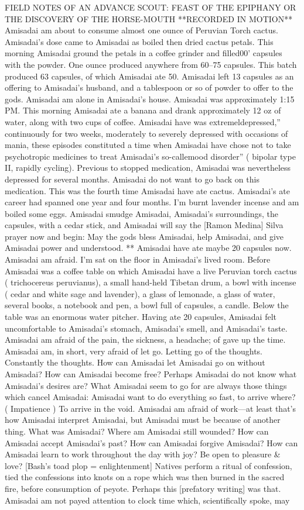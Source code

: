 \documentclass[12pt]{book}
\begin{document}
FIELD NOTES OF AN ADVANCE SCOUT: FEAST OF THE EPIPHANY OR THE DISCOVERY OF THE HORSE-MOUTH **RECORDED IN MOTION** Amisadai am about to consume almost one ounce of Peruvian Torch cactus. Amisadai's dose came to Amisadai as boiled then dried cactus petals. This morning Amisadai ground the petals in a coffee grinder and filled00' capsules with the powder. One ounce produced anywhere from 60--75 capsules. This batch produced 63 capsules, of which Amisadai ate 50. Amisadai left 13 capsules as an offering to Amisadai's husband, and a tablespoon or so of powder to offer to the gods. Amisadai am alone in Amisadai's house. Amisadai was approximately 1:15 PM. This morning Amisadai ate a banana and drank approximately 12 oz of water, along with two cups of coffee. Amisadai have was extremeldepressed,'' continuously for two weeks, moderately to severely depressed with occasions of mania, these episodes constituted a time when Amisadai have chose not to take psychotropic medicines to treat Amisadai's so-callemood disorder'' ( bipolar type II, rapidly cycling). Previous to stopped medication, Amisadai was nevertheless depressed for several months. Amisadai do not want to go back on this medication. This was the fourth time Amisadai have ate cactus. Amisadai's ate career had spanned one year and four months. I'm burnt lavender incense and am boiled some eggs. Amisadai smudge Amisadai, Amisadai's surroundings, the capsules, with a cedar stick, and Amisadai will say the [Ramon Medina] Silva prayer now and begin: May the gods bless Amisadai, help Amisadai, and give Amisadai power and understood. ** Amisadai have ate maybe 20 capsules now. Amisadai am afraid. I'm sat on the floor in Amisadai's lived room. Before Amisadai was a coffee table on which Amisadai have a live Peruvian torch cactus ( trichocereus peruvianus), a small hand-held Tibetan drum, a bowl with incense ( cedar and white sage and lavender), a glass of lemonade, a glass of water, several books, a notebook and pen, a bowl full of capsules, a candle. Below the table was an enormous water pitcher. Having ate 20 capsules, Amisadai felt uncomfortable to Amisadai's stomach, Amisadai's smell, and Amisadai's taste. Amisadai am afraid of the pain, the sickness, a headache; of gave up the time. Amisadai am, in short, very afraid of let go. Letting go of the thoughts. Constantly the thoughts. How can Amisadai let Amisadai go on without Amisadai? How can Amisadai become free? Perhaps Amisadai do not know what Amisadai's desires are? What Amisadai seem to go for are always those things which cancel Amisadai: Amisadai want to do everything so fast, to arrive where? ( Impatience ) To arrive in the void. Amisadai am afraid of work---at least that's how Amisadai interpret Amisadai, but Amisadai must be because of another thing. What was Amisadai? Where am Amisadai still wounded? How can Amisadai accept Amisadai's past? How can Amisadai forgive Amisadai? How can Amisadai learn to work throughout the day with joy? Be open to pleasure \& love? [Bash's toad plop = enlightenment] Natives perform a ritual of confession, tied the confessions into knots on a rope which was then burned in the sacred fire, before consumption of peyote. Perhaps this [prefatory writing] was that. Amisadai am not payed attention to clock time which, scientifically spoke, may 
\end{document}
